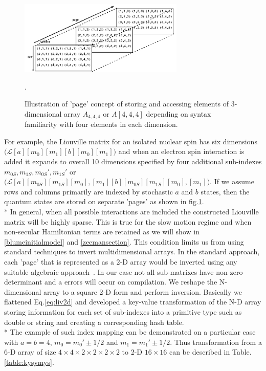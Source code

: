 \begin{figure}[h!]
\centering
\includegraphics[width=0.7\textwidth]{figures/chap1/mat.png}
\caption{Illustration of 'page' concept of storing and accessing elements of 3-dimensional array $A_{4,4,4}$ or $A[4,4,4]$ depending on syntax familiarity with four elements in each dimension.~\cite{Matlab}}. 
\label{figure:matlabnd}
\end{figure}
For example, the Liouville matrix for an isolated nuclear spin has six dimensions $\Big(\mathcal{L}[a][m_0][m_1][b][m_0][m_1]\Big)$ and when an electron spin interaction is added it expands to overall 10 dimensions specified by four additional sub-indexes $m_{0S},m_{1S},m_{0S}',m_{1S}'$ or $\Big(\mathcal{L}[a][m_{0S}][m_{1S}][m_0],[m_1][b][m_{0S}][m_{1S}][m_0],[m_1]\Big)$. If we assume rows and columns primarily are indexed by stochastic $a$ and $b$ states, then the quantum states are stored on separate 'pages' as shown in fig.\ref{figure:matlabnd}. \\*
In general, when all possible interactions are included the constructed Liouville matrix will be highly sparse. This is true for the slow motion regime and when non-secular Hamiltonian terms are retained as we will show in \ref{blumeinitialmodel} and \ref{zeemansection}. This condition limits us from using standard techniques to invert multidimensional arrays. In the standard approach, each 'page' that is represented as a 2-D array would be inverted using any suitable algebraic approach~\cite{solo}. In our case not all sub-matrixes have non-zero determinant and a errors will occur on compilation. We reshape the N-dimensional array to a square 2-D form and perform inversion. Basically we flattened Eq.\ref{eq:liv2d} and developed a key-value transformation of the N-D array storing information for each set of sub-indexes into a primitive type such as double or string and creating a corresponding hash table.\\*
The example of such index mapping can be demonstrated on a particular case with $a=b=4$, $m_0=m_0'\pm1/2$ and $m_1=m_1'\pm1/2$. Thus transformation from a 6-D array of size $4\times4\times2\times2\times2\times2$ to 2-D $16\times16$ can be described in Table.\ref{table:kysymys}.
